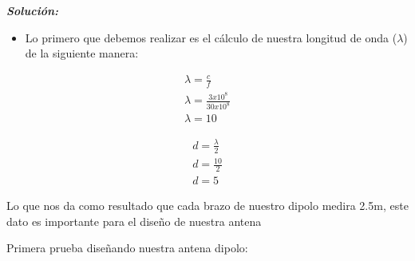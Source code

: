 \documentclass[11pt,a4paper]{article}
\begin{document}
\textit{\textbf{Soluci\'on:}}
\begin{itemize}
    \item Lo primero que debemos realizar es el c\'alculo de nuestra longitud de onda ($\lambda$) de la siguiente manera:
\end{itemize}

\begin{align*}
    \lambda=\frac{c}{f}\\
    \lambda=\frac{3x10^8}{30x10^8}\\
    \lambda=10
\end{align*}


\begin{align*}
    d=\frac{\lambda}{2}\\
    d=\frac{10}{2}\\
    d=5
\end{align*}
    
Lo que nos da como resultado que cada brazo de nuestro dipolo medira 2.5m, este dato es importante para el diseño de nuestra antena 

Primera prueba diseñando nuestra antena dipolo:\\
\end{document}
